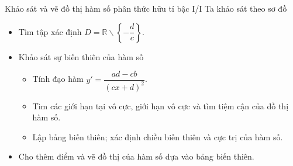 \begin{dang}{Khảo sát và vẽ đồ thị hàm số phân thức hữu tỉ bậc I/I}
	Ta khảo sát theo sơ đồ
	\begin{itemize}
		\item[\iconCH]  Tìm tập xác định $D=\mathbb{R}\backslash \left\{-\dfrac{d}{c}\right\}$.
		\item [\iconCH]  Khảo sát sự biến thiên của hàm số
		      \begin{itemize}
			      \item Tính đạo hàm $y'=\dfrac{ad-cb}{(cx+d)^2}$.
			      \item Tìm các giới hạn tại vô cực, giới hạn vô cực và tìm tiệm cận của đồ thị hàm số.
			      \item Lập bảng biến thiên; xác định chiều biến thiên và cực trị của hàm số.
		      \end{itemize}
		\item [\iconCH]  Cho thêm điểm và vẽ đồ thị của hàm số dựa vào bảng biến thiên.
	\end{itemize}
\end{dang}
